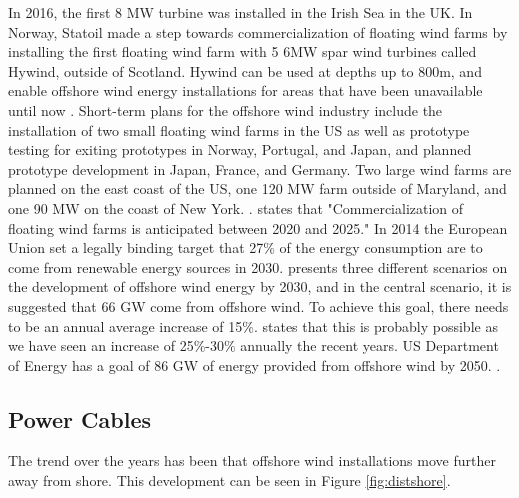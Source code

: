  \noindent In 2016, the first 8 MW turbine was installed in the Irish Sea in the UK. In Norway, Statoil made a step towards commercialization of floating wind farms by installing the first floating wind farm with 5 6MW spar wind turbines called Hywind, outside of Scotland. Hywind can be used at depths up to 800m, and enable offshore wind energy installations for areas that have been unavailable until now \cite{Equinor2018}. Short-term plans for the offshore wind industry include the installation of two small floating wind farms in the US as well as prototype testing for exiting prototypes in Norway, Portugal, and Japan, and planned prototype development in Japan, France, and Germany.  Two large wind farms are planned on the east coast of the US, one 120 MW farm outside of Maryland, and one 90 MW on the coast of New York. \cite{Gao2018}. \newline
 \newline
 \cite{Bailey2014} states that "Commercialization of floating wind farms is
anticipated between 2020 and 2025." In 2014 the European Union set a legally binding target that 27\% of the energy consumption are to come from renewable energy sources in 2030. \cite{EWEA2015}  presents three different scenarios on the development of offshore wind energy by 2030, and in the central scenario, it is suggested that 66 GW come from offshore wind. To achieve this goal, there needs to be an annual average increase of 15\%. \cite{Gao2018} states that this is probably possible as we have seen an increase of 25\%-30\% annually the recent years. US Department of Energy has a goal of 86 GW of energy provided from offshore wind by 2050. \cite{windus2016}. 
\subsection{Power Cables}
The trend over the years has been that offshore wind installations move further away from shore. This development can be seen in Figure \ref{fig:distshore}. 

